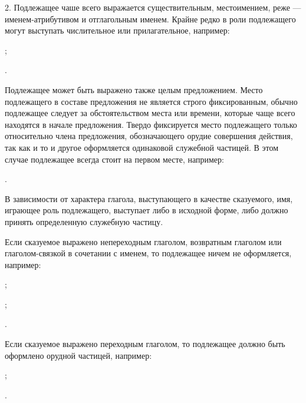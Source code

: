 2. Подлежащее чаше всего выражается существительным, местоимением, реже --- именем-атрибутивом и отглагольным именем. Крайне редко в роли подлежащего могут выступать числительное или прилагательное, например:
\begin{prfsample}
	\item {};
	\item {}.
\end{prfsample}
Подлежащее может быть выражено также целым предложением. Место подлежащего в составе предложения не является строго фиксированным, обычно подлежащее следует за обстоятельством места или времени, которые чаще всего находятся в начале предложения. Твердо фиксируется место подлежащего только относительно члена предложения, обозначающего орудие совершения действия, так как и то и другое оформляется одинаковой служебной частицей. В этом случае подлежащее всегда стоит на первом месте, например:
\begin{prfsample}
	\item {}.
\end{prfsample}

В зависимости от характера глагола, выступающего в качестве сказуемого, имя, играющее роль подлежащего, выступает либо в исходной форме, либо должно принять определенную служебную частицу.

Если сказуемое выражено непереходным глаголом, возвратным глаголом или глаголом-связкой в сочетании с именем, то подлежащее ничем не оформляется, например:
\begin{prfsample}
	\item {};
	\item {};
	\item {}.
\end{prfsample}

Если сказуемое выражено переходным глаголом, то подлежащее должно быть оформлено орудной частицей, например:
\begin{prfsample}
	\item {};
	\item {}.
\end{prfsample}

